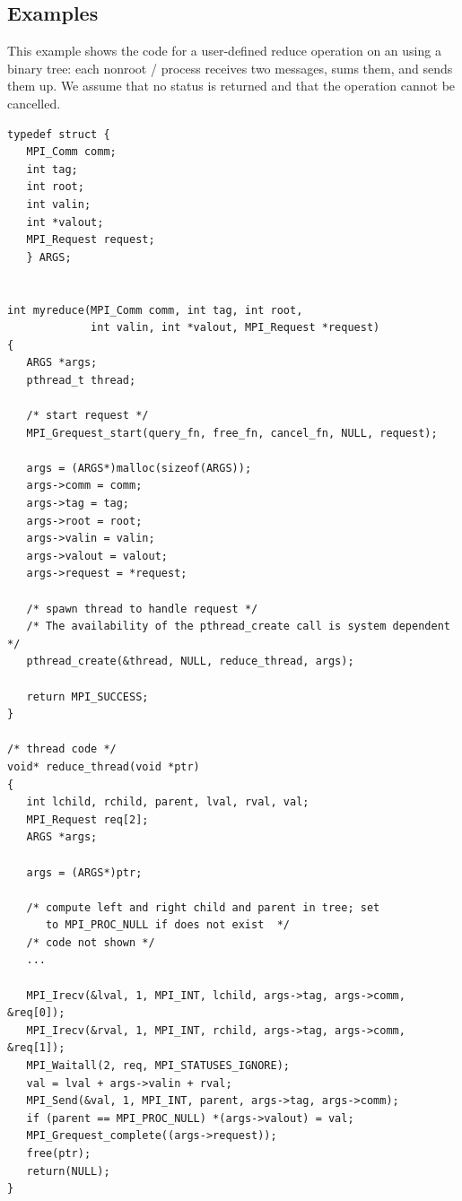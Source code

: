 \subsection{Examples}

\begin{example}
%
This example shows the code for a user-defined reduce operation on an
 using
a binary tree: each nonroot \MPI/ process receives two messages, sums them, 
and sends them up.  We assume that no status is returned and that the
operation cannot be cancelled.

\begin{lstlisting}[language={[MPI]C}]
typedef struct {
   MPI_Comm comm;
   int tag;
   int root;
   int valin;
   int *valout;
   MPI_Request request;
   } ARGS;


int myreduce(MPI_Comm comm, int tag, int root,
             int valin, int *valout, MPI_Request *request)
{
   ARGS *args;
   pthread_t thread;
   
   /* start request */
   MPI_Grequest_start(query_fn, free_fn, cancel_fn, NULL, request);
   
   args = (ARGS*)malloc(sizeof(ARGS));
   args->comm = comm;
   args->tag = tag;
   args->root = root;
   args->valin = valin;
   args->valout = valout;
   args->request = *request;
   
   /* spawn thread to handle request */
   /* The availability of the pthread_create call is system dependent */
   pthread_create(&thread, NULL, reduce_thread, args);
   
   return MPI_SUCCESS;
}

/* thread code */
void* reduce_thread(void *ptr) 
{
   int lchild, rchild, parent, lval, rval, val;
   MPI_Request req[2];
   ARGS *args;
   
   args = (ARGS*)ptr;
   
   /* compute left and right child and parent in tree; set 
      to MPI_PROC_NULL if does not exist  */
   /* code not shown */
   ...
     
   MPI_Irecv(&lval, 1, MPI_INT, lchild, args->tag, args->comm, &req[0]);
   MPI_Irecv(&rval, 1, MPI_INT, rchild, args->tag, args->comm, &req[1]);
   MPI_Waitall(2, req, MPI_STATUSES_IGNORE);
   val = lval + args->valin + rval;
   MPI_Send(&val, 1, MPI_INT, parent, args->tag, args->comm);
   if (parent == MPI_PROC_NULL) *(args->valout) = val;
   MPI_Grequest_complete((args->request));   
   free(ptr);
   return(NULL);
}


\end{lstlisting}
\end{example}
